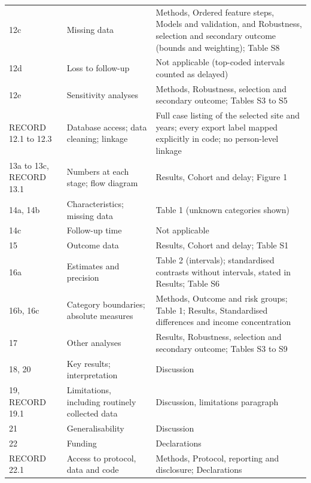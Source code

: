 \documentclass[10pt,a4paper]{article}
\begin{document}
{\begin{longtable}{@{}>{\raggedright}p{2.3cm}>{\raggedright}p{5.0cm}>{\raggedright\arraybackslash}p{7.8cm}@{}}
12c & Missing data & Methods, Ordered feature steps, Models and validation, and Robustness, selection and secondary outcome (bounds and weighting); Table S8 \\
12d & Loss to follow-up & Not applicable (top-coded intervals counted as delayed) \\
12e & Sensitivity analyses & Methods, Robustness, selection and secondary outcome; Tables S3 to S5 \\
RECORD 12.1 to 12.3 & Database access; data cleaning; linkage & Full case listing of the selected site and years; every export label mapped explicitly in code; no person-level linkage \\
13a to 13c, RECORD 13.1 & Numbers at each stage; flow diagram & Results, Cohort and delay; Figure 1 \\
14a, 14b & Characteristics; missing data & Table 1 (unknown categories shown) \\
14c & Follow-up time & Not applicable \\
15 & Outcome data & Results, Cohort and delay; Table S1 \\
16a & Estimates and precision & Table 2 (intervals); standardised contrasts without intervals, stated in Results; Table S6 \\
16b, 16c & Category boundaries; absolute measures & Methods, Outcome and risk groups; Table 1; Results, Standardised differences and income concentration \\
17 & Other analyses & Results, Robustness, selection and secondary outcome; Tables S3 to S9 \\
18, 20 & Key results; interpretation & Discussion \\
19, RECORD 19.1 & Limitations, including routinely collected data & Discussion, limitations paragraph \\
21 & Generalisability & Discussion \\
22 & Funding & Declarations \\
RECORD 22.1 & Access to protocol, data and code & Methods, Protocol, reporting and disclosure; Declarations \\
\bottomrule
\end{longtable}
}
\end{document}
